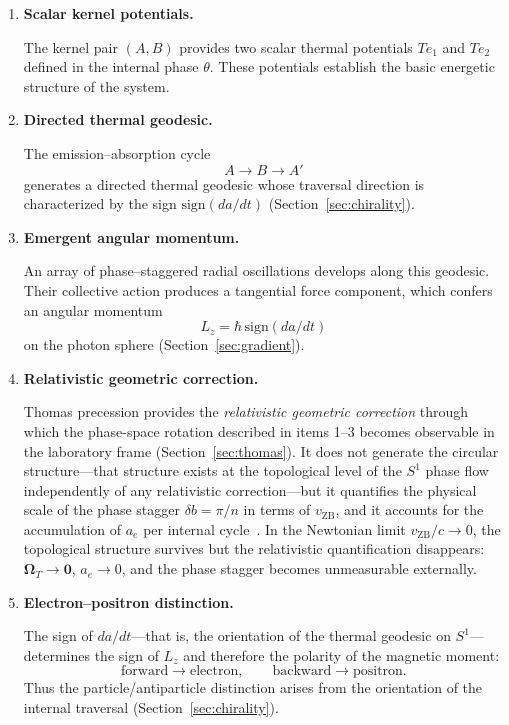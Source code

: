 \documentclass[%
 reprint, amsmath,amssymb, aps, prb, ]{revtex4-2}
\numberwithin{equation}{section}
\newcommand{\iphase}{\theta}
\begin{document}
\begin{enumerate}

\item \textbf{Scalar kernel potentials.}

The kernel pair $(A,B)$ provides two scalar thermal potentials $Te_1$ and $Te_2$ defined in the internal phase $\iphase$. These potentials establish the basic energetic structure of the system.

\item \textbf{Directed thermal geodesic.}

The emission--absorption cycle
\[
A \rightarrow B \rightarrow A'
\]
generates a directed thermal geodesic whose traversal direction is characterized by the sign $\text{sign}(da/dt)$ (Section~\ref{sec:chirality}).

\item \textbf{Emergent angular momentum.}

An array of phase--staggered radial oscillations develops along this geodesic. Their collective action produces a tangential force component, which confers an angular momentum
\[
L_z = \hbar\,\text{sign}(da/dt)
\]
on the photon sphere (Section~\ref{sec:gradient}).

\item \textbf{Relativistic geometric correction.}

Thomas precession provides the \emph{relativistic geometric correction} through which the phase-space rotation described in items 1--3 becomes observable in the laboratory frame (Section~\ref{sec:thomas}). It does not generate the circular structure---that structure exists at the topological level of the $S^1$ phase flow independently of any relativistic correction---but it quantifies the physical scale of the phase stagger $\delta b=\pi/n$ in terms of $v_\mathrm{ZB}$, and it accounts for the accumulation of $a_e$ per internal cycle~\cite{hanamura47}. In the Newtonian limit $v_\mathrm{ZB}/c\to 0$, the topological structure survives but the relativistic quantification disappears: $\boldsymbol{\Omega}_T\to\mathbf{0}$, $a_e\to 0$, and the phase stagger becomes unmeasurable externally.

\item \textbf{Electron--positron distinction.}

The sign of $da/dt$---that is, the orientation of the thermal geodesic on $S^1$---determines the sign of $L_z$ and therefore the polarity of the magnetic moment:
\[
\text{forward} \rightarrow \text{electron},
\qquad
\text{backward} \rightarrow \text{positron}.
\]
Thus the particle/antiparticle distinction arises from the orientation of the internal traversal (Section~\ref{sec:chirality}).

\end{enumerate}
\end{document}

